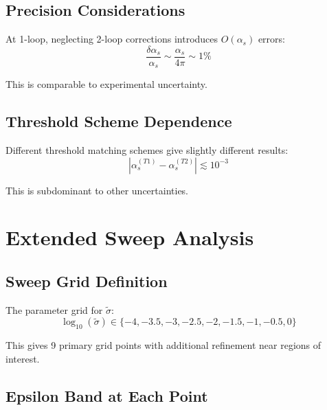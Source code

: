 \documentclass[11pt,a4paper]{article}
\theoremstyle{definition}
\begin{document}
\subsection{Precision Considerations}
\label{subsec:precision}

At 1-loop, neglecting 2-loop corrections introduces $O(\alpha_s)$ errors:
\begin{equation}
\label{eq:precision}
\frac{\delta\alpha_s}{\alpha_s} \sim \frac{\alpha_s}{4\pi} \sim 1\%
\end{equation}

This is comparable to experimental uncertainty.

\subsection{Threshold Scheme Dependence}
\label{subsec:scheme}

Different threshold matching schemes give slightly different results:
\begin{equation}
\label{eq:scheme-diff}
|\alpha_s^{(T1)} - \alpha_s^{(T2)}| \lesssim 10^{-3}
\end{equation}

This is subdominant to other uncertainties.

\section{Extended Sweep Analysis}
\label{app:sweep-analysis}

\subsection{Sweep Grid Definition}
\label{subsec:sweep-grid}

The parameter grid for $\tilde{\sigma}$:
\begin{equation}
\label{eq:grid-log}
\log_{10}(\tilde{\sigma}) \in \{-4, -3.5, -3, -2.5, -2, -1.5, -1, -0.5, 0\}
\end{equation}

This gives 9 primary grid points with additional refinement near regions of interest.

\subsection{Epsilon Band at Each Point}
\label{subsec:eps-band}
\end{document}
